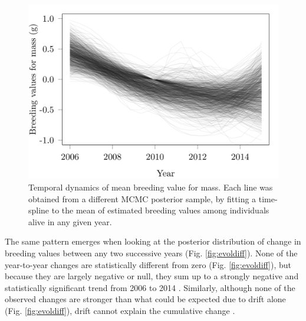 \begin{figure}[ht]
\includegraphics[width=\textwidth]{FiguresFluSel/EvolSmooth-1}
\caption{Temporal dynamics of mean breeding value for mass. Each line was obtained from a different MCMC posterior sample, by fitting a time-spline to the mean of estimated breeding values among individuals alive in any given year.}
\label{fig:evolsmooth}
\end{figure}

The same pattern emerges when looking at the posterior distribution of change in breeding values between any two successive years (Fig. \ref{fig:evoldiff}). None of the year-to-year changes are statistically different from zero (Fig. \ref{fig:evoldiff}), but because they are largely negative or null, they sum up to a strongly negative and statistically significant trend from 2006 to 2014 \parencite{Bonnet2016}. Similarly, although none of the observed changes are stronger than what could be expected due to drift alone (Fig. \ref{fig:evoldiff}), drift cannot explain the cumulative change \parencite{Bonnet2016}.
 
